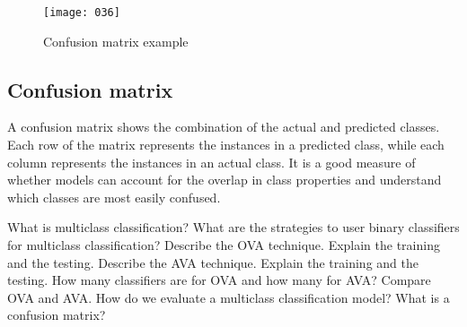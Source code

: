 \begin{figure}[t]
	\begin{center}
		\texttt{[image: 036]}
	\end{center}
	\caption{Confusion matrix example}
	\vspace*{-20pt}
	\label{fig:036}
\end{figure}
\subsection{Confusion matrix}
A confusion matrix shows the combination of the actual and predicted classes. Each row of the matrix represents the instances in a predicted class, while each column represents the instances in an actual class. It is a good measure of whether models can account for the overlap in class properties and understand which classes are most easily confused.

\newpage
\begin{exercise}[topsep=20pt,itemsep=10pt]
	\ex What is multiclass classification? 
	\ex What are the strategies to user binary classifiers for multiclass classification?
	\ex[!] Describe the OVA technique. Explain the training and the testing.
	\ex[!] Describe the AVA technique. Explain the training and the testing.
	\ex[!] How many classifiers are for OVA and how many for AVA?
	\ex[!] Compare OVA and AVA.
	\ex How do we evaluate a multiclass classification model?
	\ex What is a confusion matrix?
\end{exercise}
